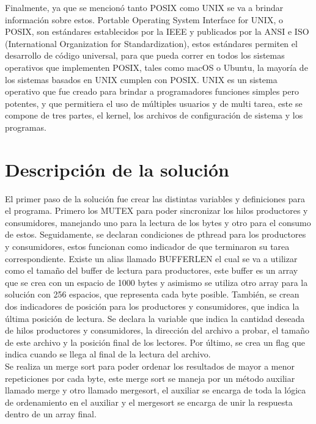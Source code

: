 \documentclass[10pt, article, natbib]{IEEEtran}
\begin{document}
Finalmente, ya que se mencionó tanto POSIX como UNIX se va a brindar información sobre estos. Portable Operating System Interface for UNIX, o POSIX, son estándares establecidos por la IEEE y publicados por la ANSI e ISO (International Organization for Standardization), estos estándares permiten el desarrollo de código universal, para que pueda correr en todos los sistemas operativos que implementen POSIX, tales como macOS o Ubuntu, la mayoría de los sistemas basados en UNIX cumplen con POSIX.\cite{universityinformationtechnologyservices_2021_about} UNIX es un sistema operativo que fue creado para brindar a programadores funciones simples pero potentes, y que permitiera el uso de múltiples usuarios y de multi tarea, este se compone de tres partes, el kernel, los archivos de configuración de sistema y los programas.\cite{idahostateuniversity_1997_what}

\section{Descripción de la solución}
El primer paso de la solución fue crear las distintas variables y definiciones para el programa. Primero los MUTEX para poder sincronizar los hilos productores y consumidores, manejando uno para la lectura de los bytes y otro para el consumo de estos.\cite{cppdev_2010_c} \cite{manrow_2011_c} Seguidamente, se declaran condiciones de pthread para los productores y consumidores, estos funcionan como indicador de que terminaron su tarea correspondiente.\cite{theopengroup_1997_pthread_cond_wait} Existe un alias llamado BUFFERLEN el cual se va a utilizar como el tamaño del buffer de lectura para productores, este buffer es un array que se crea con un espacio de 1000 bytes y asimismo se utiliza otro array para la solución con 256 espacios, que representa cada byte posible. También, se crean dos indicadores de posición para los productores y consumidores, que indica la última posición de lectura. Se declara la variable que indica la cantidad deseada de hilos productores y consumidores, la dirección del archivo a probar, el tamaño de este archivo y la posición final de los lectores. Por último, se crea un flag que indica cuando se llega al final de la lectura del archivo.\\

Se realiza un merge sort para poder ordenar los resultados de mayor a menor repeticiones por cada byte, este merge sort se maneja por un método auxiliar llamado merge y otro llamado mergesort, el auxiliar se encarga de toda la lógica de ordenamiento en el auxiliar y el mergesort se encarga de unir la respuesta dentro de un array final.\\
\end{document}
